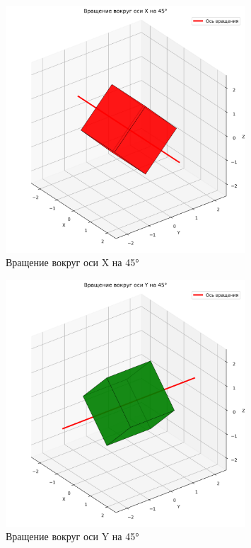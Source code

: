 \begin{figure}[H]
\centering
\includegraphics[width=0.8\textwidth]{images/task4/rotate_x.png}
\caption{Вращение вокруг оси X на 45°}
\end{figure}

\begin{figure}[H]
\centering
\includegraphics[width=0.8\textwidth]{images/task4/rotate_y.png}
\caption{Вращение вокруг оси Y на 45°}
\end{figure}

